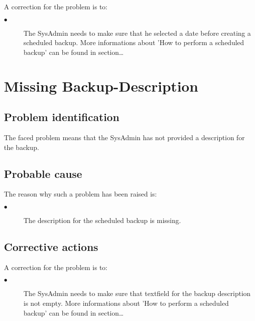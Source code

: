 A correction for the problem is to:\\
\begin{description}
\item[$\bullet$] The SysAdmin needs to make sure that he selected a date before
creating a scheduled backup. More informations about 'How to perform a scheduled
backup' can be found in section\ldots

\end{description}







\section{Missing Backup-Description} 

\subsection{Problem identification}
The faced problem means that the SysAdmin has not provided a description for
the backup.

\subsection{Probable cause}

The reason why such a problem has been raised is:\\
\begin{description}
\item[$\bullet$] The description for the scheduled backup is missing.
\end{description}


\subsection{Corrective actions}

A correction for the problem is to:\\
\begin{description}
\item[$\bullet$] The SysAdmin needs to make sure that textfield for the backup
description is not empty. More informations about 'How to perform a scheduled
backup' can be found in section\ldots

\end{description}










